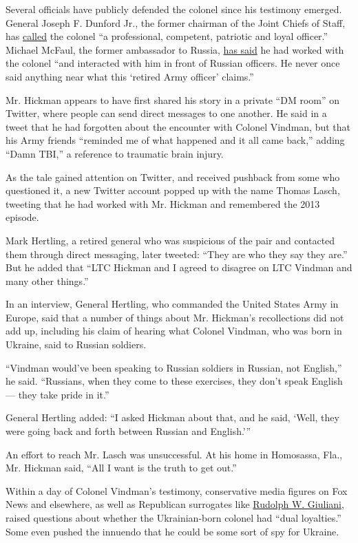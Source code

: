 Several officials have publicly defended the colonel since his testimony
emerged. General Joseph F. Dunford Jr., the former chairman of the Joint
Chiefs of Staff, has
\href{https://thehill.com/homenews/administration/468262-dunford-on-vindman-a-professional-competent-patriotic-and-loyal}{called}
the colonel ``a professional, competent, patriotic and loyal officer.''
Michael McFaul, the former ambassador to Russia,
\href{https://twitter.com/McFaul/status/1191983177725861892}{has said}
he had worked with the colonel ``and interacted with him in front of
Russian officers. He never once said anything near what this `retired
Army officer' claims.''

Mr. Hickman appears to have first shared his story in a private ``DM
room'' on Twitter, where people can send direct messages to one another.
He said in a tweet that he had forgotten about the encounter with
Colonel Vindman, but that his Army friends ``reminded me of what
happened and it all came back,'' adding ``Damn TBI,'' a reference to
traumatic brain injury.

As the tale gained attention on Twitter, and received pushback from some
who questioned it, a new Twitter account popped up with the name Thomas
Lasch, tweeting that he had worked with Mr. Hickman and remembered the
2013 episode.

Mark Hertling, a retired general who was suspicious of the pair and
contacted them through direct messaging, later tweeted: ``They are who
they say they are.'' But he added that ``LTC Hickman and I agreed to
disagree on LTC Vindman and many other things.''

In an interview, General Hertling, who commanded the United States Army
in Europe, said that a number of things about Mr. Hickman's
recollections did not add up, including his claim of hearing what
Colonel Vindman, who was born in Ukraine, said to Russian soldiers.

``Vindman would've been speaking to Russian soldiers in Russian, not
English,'' he said. ``Russians, when they come to these exercises, they
don't speak English --- they take pride in it.''

General Hertling added: ``I asked Hickman about that, and he said,
`Well, they were going back and forth between Russian and English.'''

An effort to reach Mr. Lasch was unsuccessful. At his home in Homosassa,
Fla., Mr. Hickman said, ``All I want is the truth to get out.''

Within a day of Colonel Vindman's testimony, conservative media figures
on Fox News and elsewhere, as well as Republican surrogates like
\href{https://www.nytimes.com/2019/11/06/us/politics/ukraine-giuliani-charles-gucciardo.html}{Rudolph
W. Giuliani}, raised questions about whether the Ukrainian-born colonel
had ``dual loyalties.'' Some even pushed the innuendo that he could be
some sort of spy for Ukraine.

